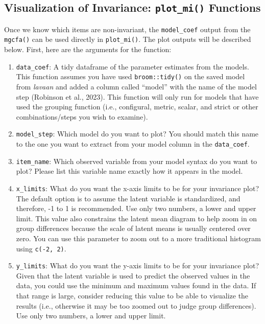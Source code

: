 \documentclass[
  man,floatsintext]{apa7}
\providecommand{\tightlist}{%
  \setlength{\itemsep}{0pt}\setlength{\parskip}{0pt}}
\begin{document}
\newpage

\subsection{\texorpdfstring{Visualization of Invariance: \texttt{plot\_mi()} Functions}{Visualization of Invariance: plot\_mi() Functions}}\label{visualization-of-invariance-plot_mi-functions}

Once we know which items are non-invariant, the \texttt{model\_coef} output from the \texttt{mgcfa()} can be used directly in \texttt{plot\_mi()}. The plot outputs will be described below. First, here are the arguments for the function:

\begin{enumerate}
\def\labelenumi{\arabic{enumi})}
\tightlist
\item
  \texttt{data\_coef}: A tidy dataframe of the parameter estimates from the models. This function assumes you have used \texttt{broom::tidy()} on the saved model from \emph{lavaan} and added a column called ``model'' with the name of the model step (Robinson et al., 2023). This function will only run for models that have used the grouping function (i.e., configural, metric, scalar, and strict or other combinations/steps you wish to examine).
\item
  \texttt{model\_step}: Which model do you want to plot? You should match this name to the one you want to extract from your model column in the \texttt{data\_coef}.
\item
  \texttt{item\_name}: Which observed variable from your model syntax do you want to plot? Please list this variable name exactly how it appears in the model.
\item
  \texttt{x\_limits}: What do you want the x-axis limits to be for your invariance plot? The default option is to assume the latent variable is standardized, and therefore, -1 to 1 is recommended. Use only two numbers, a lower and upper limit. This value also constrains the latent mean diagram to help zoom in on group differences because the scale of latent means is usually centered over zero. You can use this parameter to zoom out to a more traditional histogram using \texttt{c(-2,\ 2)}.
\item
  \texttt{y\_limits}: What do you want the y-axis limits to be for your invariance plot? Given that the latent variable is used to predict the observed values in the data, you could use the minimum and maximum values found in the data. If that range is large, consider reducing this value to be able to visualize the results (i.e., otherwise it may be too zoomed out to judge group differences). Use only two numbers, a lower and upper limit.

\end{enumerate}
\end{document}
